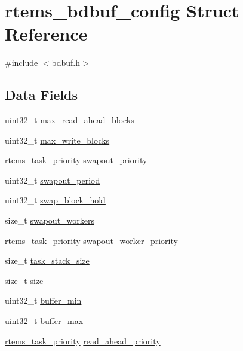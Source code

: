 \hypertarget{structrtems__bdbuf__config}{}\section{rtems\+\_\+bdbuf\+\_\+config Struct Reference}
\label{structrtems__bdbuf__config}


{\ttfamily \#include $<$bdbuf.\+h$>$}

\subsection*{Data Fields}
\begin{DoxyCompactItemize}
\item 
uint32\+\_\+t \mbox{\hyperlink{structrtems__bdbuf__config_af001265475964e0b642aaed499fa9112}{max\+\_\+read\+\_\+ahead\+\_\+blocks}}
\item 
uint32\+\_\+t \mbox{\hyperlink{structrtems__bdbuf__config_a6c761b0903e9f4424bca83752f105ac3}{max\+\_\+write\+\_\+blocks}}
\item 
\mbox{\hyperlink{group__ClassicTasks_gaa80a0c0938307d1e99d0eb5fee765b47}{rtems\+\_\+task\+\_\+priority}} \mbox{\hyperlink{structrtems__bdbuf__config_aac1bde185c1c9936649551b209eabde0}{swapout\+\_\+priority}}
\item 
uint32\+\_\+t \mbox{\hyperlink{structrtems__bdbuf__config_a727dbe8cda482d9e45a1b856054aa744}{swapout\+\_\+period}}
\item 
uint32\+\_\+t \mbox{\hyperlink{structrtems__bdbuf__config_a59bafb19a275d511f5952a9494e885ce}{swap\+\_\+block\+\_\+hold}}
\item 
size\+\_\+t \mbox{\hyperlink{structrtems__bdbuf__config_a1e533ddc939b17f55b696664f452340a}{swapout\+\_\+workers}}
\item 
\mbox{\hyperlink{group__ClassicTasks_gaa80a0c0938307d1e99d0eb5fee765b47}{rtems\+\_\+task\+\_\+priority}} \mbox{\hyperlink{structrtems__bdbuf__config_a20078c2e1193022a4887db13e803570c}{swapout\+\_\+worker\+\_\+priority}}
\item 
size\+\_\+t \mbox{\hyperlink{structrtems__bdbuf__config_a5716931c17530600fe73943eecd6f3f4}{task\+\_\+stack\+\_\+size}}
\item 
size\+\_\+t \mbox{\hyperlink{structrtems__bdbuf__config_a2d29b5bf4572ec7a3caedbe51bc6d6fd}{size}}
\item 
uint32\+\_\+t \mbox{\hyperlink{structrtems__bdbuf__config_a5930452ff776ebc7153d0bb261bd3b36}{buffer\+\_\+min}}
\item 
uint32\+\_\+t \mbox{\hyperlink{structrtems__bdbuf__config_acba6b2e2d78ab3ef64f2b7bc7b6eb95e}{buffer\+\_\+max}}
\item 
\mbox{\hyperlink{group__ClassicTasks_gaa80a0c0938307d1e99d0eb5fee765b47}{rtems\+\_\+task\+\_\+priority}} \mbox{\hyperlink{structrtems__bdbuf__config_acb0ba230f9a72c488b05636870ee2919}{read\+\_\+ahead\+\_\+priority}}
\end{DoxyCompactItemize}


